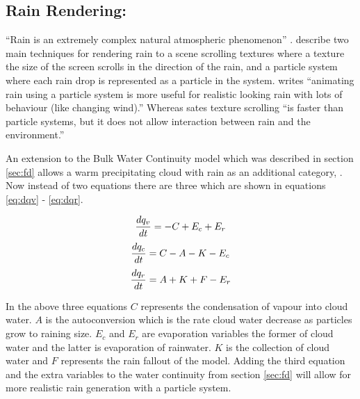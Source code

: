 \subsection{Rain Rendering:}
\label{sec:rain}
“Rain is an extremely complex natural atmospheric phenomenon” \citep*{APuig-Centelles09}.
\citet*{APuig-Centelles09} describe two main techniques for rendering rain to a scene scrolling textures where a texture the size of the screen scrolls in the direction of the rain, and a particle system where each rain drop is represented as a particle in the system.
\citet{STariq07} writes “animating rain using a particle system is more useful for realistic looking rain with lots of behaviour (like changing wind).”
Whereas \citet*{APuig-Centelles09} sates texture scrolling “is faster than particle systems, but it does not allow interaction between rain and the environment.”

An extension to the Bulk Water Continuity model which was described in section \ref{sec:fd} allows a warm precipitating cloud with rain as an additional category, \citet{houze1994cloud}.
Now instead of two equations there are three which are shown in equations \ref{eq:dqv} - \ref{eq:dqr}.

\begin{equation} \label{eq:dqv}
  \centering
  \frac{dq_{v}}{dt} = - C + E_{c} + E_{r}
\end{equation}
\begin{equation} \label{eq:dqc}
  \centering
  \frac{dq_{c}}{dt} = C - A - K - E_{c}
\end{equation}
\begin{equation} \label{eq:dqr}
  \centering
  \frac{dq_{r}}{dt} = A + K + F - E_{r}
\end{equation}

In the above three equations $C$ represents the condensation of vapour into cloud water.
$A$ is the autoconversion which is the rate cloud water decrease as particles grow to raining size.
$E_{c}$ and $E_{r}$  are evaporation variables the former of cloud water and the latter is evaporation of rainwater.
$K$ is the collection of cloud water and $F$ represents the rain fallout of the model.
Adding the third equation and the extra variables to the water continuity from section \ref{sec:fd} will allow for more realistic rain generation with a particle system.
